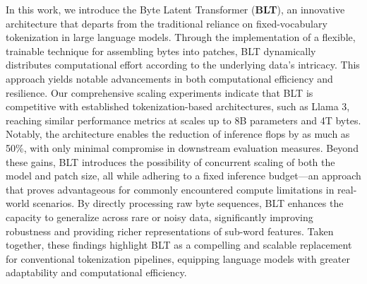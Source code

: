 In this work, we introduce the Byte Latent Transformer (\textbf{BLT}), an innovative architecture that departs from the traditional reliance on fixed-vocabulary tokenization in large language models. Through the implementation of a flexible, trainable technique for assembling bytes into patches, {\textsc BLT} dynamically distributes computational effort according to the underlying data’s intricacy. This approach yields notable advancements in both computational efficiency and resilience. Our comprehensive scaling experiments indicate that {\textsc BLT} is competitive with established tokenization-based architectures, such as Llama 3, reaching similar performance metrics at scales up to 8B parameters and 4T bytes. Notably, the architecture enables the reduction of inference flops by as much as 50\%, with only minimal compromise in downstream evaluation measures. Beyond these gains, {\textsc BLT} introduces the possibility of concurrent scaling of both the model and patch size, all while adhering to a fixed inference budget—an approach that proves advantageous for commonly encountered compute limitations in real-world scenarios. By directly processing raw byte sequences, {\textsc BLT} enhances the capacity to generalize across rare or noisy data, significantly improving robustness and providing richer representations of sub-word features. Taken together, these findings highlight {\textsc BLT} as a compelling and scalable replacement for conventional tokenization pipelines, equipping language models with greater adaptability and computational efficiency.

